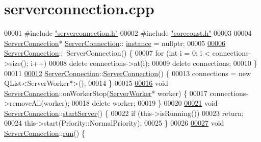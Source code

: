 \hypertarget{a00101_source}{}\section{serverconnection.\+cpp}
\label{a00101_source}

\begin{DoxyCode}
00001 \textcolor{preprocessor}{#}\textcolor{preprocessor}{include} \hyperlink{a00104}{"serverconnection.h"}
00002 \textcolor{preprocessor}{#}\textcolor{preprocessor}{include} \hyperlink{a00020}{"coreconst.h"}
00003 
00004 \hyperlink{a00181_af558fe509b60eb019281316513f6d188}{ServerConnection}* \hyperlink{a00181_af558fe509b60eb019281316513f6d188}{ServerConnection}::
      \hyperlink{a00181_adbbe8ffe6ee71b0aee4db9b6e689ba2a}{instance} = nullptr;
00005 
\hyperlink{a00181_af919491d0e2ff066b0a58cc50fc0d90d}{00006} \hyperlink{a00181_af558fe509b60eb019281316513f6d188}{ServerConnection}::~ServerConnection() \{
00007   \textcolor{keywordflow}{for} (\textcolor{keywordtype}{int} i = 0; i < connections->size(); i++)
00008     \textcolor{keyword}{delete} connections->at(i);
00009   \textcolor{keyword}{delete} connections;
00010 \}
00011 
\hyperlink{a00181_a0adf644e7715ddbb83a53651b0804dec}{00012} \hyperlink{a00181_af558fe509b60eb019281316513f6d188}{ServerConnection}::\hyperlink{a00181_a0adf644e7715ddbb83a53651b0804dec}{ServerConnection}() \{
00013   connections = \textcolor{keyword}{new} QList<ServerWorker*>();
00014 \}
00015 
\hyperlink{a00181_af558fe509b60eb019281316513f6d188}{00016} \textcolor{keywordtype}{void} \hyperlink{a00181_af558fe509b60eb019281316513f6d188}{ServerConnection}::onWorkerStop(\hyperlink{a00185_ab80ef665f93d81c71a83aa42f8d888df}{ServerWorker}* worker) \{
00017   connections->removeAll(worker);
00018   \textcolor{keyword}{delete} worker;
00019 \}
00020 
\hyperlink{a00181_a1d45a6a7b2370c82ed2849959bb18c2a}{00021} \textcolor{keywordtype}{void} \hyperlink{a00181_af558fe509b60eb019281316513f6d188}{ServerConnection}::\hyperlink{a00181_a1d45a6a7b2370c82ed2849959bb18c2a}{startServer}() \{
00022   \textcolor{keywordflow}{if} (\textcolor{keyword}{this}->isRunning())
00023     \textcolor{keywordflow}{return};
00024   \textcolor{keyword}{this}->start(Priority::NormalPriority);
00025 \}
00026 
\hyperlink{a00181_ac7f219a30789e91afa079ab5e49529bd}{00027} \textcolor{keywordtype}{void} \hyperlink{a00181_af558fe509b60eb019281316513f6d188}{ServerConnection}::\hyperlink{a00181_ac7f219a30789e91afa079ab5e49529bd}{run}() \{

\end{DoxyCode}
